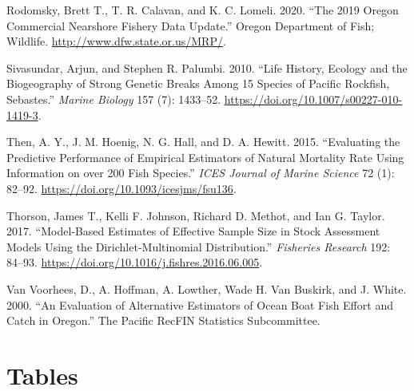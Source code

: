 \documentclass[11pt,
  english,
  a4paper,
]{article}
\begin{document}
\begin{cslreferences}
\leavevmode\hypertarget{ref-rodomsky_2019_2020}{}%
Rodomsky, Brett T., T. R. Calavan, and K. C. Lomeli. 2020. ``The 2019 Oregon Commercial Nearshore Fishery Data Update.'' Oregon Department of Fish; Wildlife. \url{http://www.dfw.state.or.us/MRP/}.

\leavevmode\hypertarget{ref-sivasundar_life_2010}{}%
Sivasundar, Arjun, and Stephen R. Palumbi. 2010. ``Life History, Ecology and the Biogeography of Strong Genetic Breaks Among 15 Species of Pacific Rockfish, Sebastes.'' \emph{Marine Biology} 157 (7): 1433--52. \url{https://doi.org/10.1007/s00227-010-1419-3}.

\leavevmode\hypertarget{ref-then_evaluating_2015}{}%
Then, A. Y., J. M. Hoenig, N. G. Hall, and D. A. Hewitt. 2015. ``Evaluating the Predictive Performance of Empirical Estimators of Natural Mortality Rate Using Information on over 200 Fish Species.'' \emph{ICES Journal of Marine Science} 72 (1): 82--92. \url{https://doi.org/10.1093/icesjms/fsu136}.

\leavevmode\hypertarget{ref-thorson_model-based_2017}{}%
Thorson, James T., Kelli F. Johnson, Richard D. Methot, and Ian G. Taylor. 2017. ``Model-Based Estimates of Effective Sample Size in Stock Assessment Models Using the Dirichlet-Multinomial Distribution.'' \emph{Fisheries Research} 192: 84--93. \url{https://doi.org/10.1016/j.fishres.2016.06.005}.

\leavevmode\hypertarget{ref-van_voorhees_evaluation_2000}{}%
Van Voorhees, D., A. Hoffman, A. Lowther, Wade H. Van Buskirk, and J. White. 2000. ``An Evaluation of Alternative Estimators of Ocean Boat Fish Effort and Catch in Oregon.'' The Pacific RecFIN Statistics Subcommittee.
\end{cslreferences}

\leavevmode\tagmcend\tagstructend

\clearpage


\hypertarget{tables}{%
\section{Tables}\label{tables}}

\leavevmode\tagmcend\tagstructend



\newpage

\begingroup\fontsize{10}{12}\selectfont
\begingroup\fontsize{10}{12}\selectfont
\end{document}

